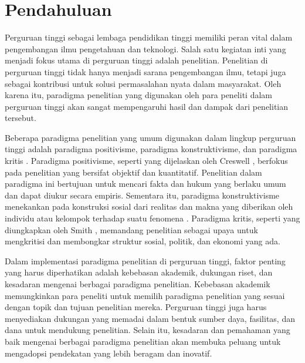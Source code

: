 \section{Pendahuluan}

Perguruan tinggi sebagai lembaga pendidikan tinggi memiliki peran vital dalam pengembangan ilmu pengetahuan dan teknologi. Salah satu kegiatan inti yang menjadi fokus utama di perguruan tinggi adalah penelitian. Penelitian di perguruan tinggi tidak hanya menjadi sarana pengembangan ilmu, tetapi juga sebagai kontribusi untuk solusi permasalahan nyata dalam masyarakat. Oleh karena itu, paradigma penelitian yang digunakan oleh para peneliti dalam perguruan tinggi akan sangat mempengaruhi hasil dan dampak dari penelitian tersebut.

Beberapa paradigma penelitian yang umum digunakan dalam lingkup perguruan tinggi adalah paradigma positivisme, paradigma konstruktivisme, dan paradigma kritis \citep{creswell2014research, guba1994competing, smith1983quantitative}. Paradigma positivisme, seperti yang dijelaskan oleh Creswell \citep{creswell2014research}, berfokus pada penelitian yang bersifat objektif dan kuantitatif. Penelitian dalam paradigma ini bertujuan untuk mencari fakta dan hukum yang berlaku umum dan dapat diukur secara empiris. Sementara itu, paradigma konstruktivisme menekankan pada konstruksi sosial dari realitas dan makna yang diberikan oleh individu atau kelompok terhadap suatu fenomena \citep{guba1994competing}. Paradigma kritis, seperti yang diungkapkan oleh Smith \citep{smith1983quantitative}, memandang penelitian sebagai upaya untuk mengkritisi dan membongkar struktur sosial, politik, dan ekonomi yang ada.

Dalam implementasi paradigma penelitian di perguruan tinggi, faktor penting yang harus diperhatikan adalah kebebasan akademik, dukungan riset, dan kesadaran mengenai berbagai paradigma penelitian. Kebebasan akademik memungkinkan para peneliti untuk memilih paradigma penelitian yang sesuai dengan topik dan tujuan penelitian mereka. Perguruan tinggi juga harus menyediakan dukungan yang memadai dalam bentuk sumber daya, fasilitas, dan dana untuk mendukung penelitian. Selain itu, kesadaran dan pemahaman yang baik mengenai berbagai paradigma penelitian akan membuka peluang untuk mengadopsi pendekatan yang lebih beragam dan inovatif.
